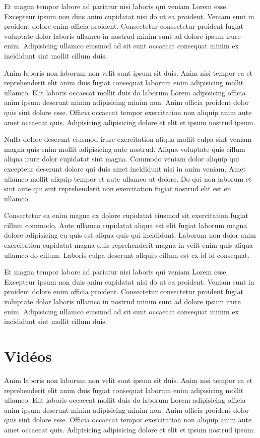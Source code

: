\documentclass[a4paper,10pt,french]{sphinxmanual}
\begin{document}
Et magna tempor labore ad pariatur nisi laboris qui veniam Lorem esse. Excepteur ipsum non duis anim cupidatat nisi do ut ea proident. Veniam sunt in proident dolore enim officia proident. Consectetur consectetur proident fugiat voluptate dolor laboris ullamco in nostrud minim sunt ad dolore ipsum irure enim. Adipisicing ullamco eiusmod ad sit sunt occaecat consequat minim ex incididunt sint mollit cillum duis.

Anim laboris non laborum non velit sunt ipsum sit duis. Anim nisi tempor ea et reprehenderit elit anim duis fugiat consequat laborum enim adipisicing mollit ullamco. Elit laboris occaecat mollit duis do laborum Lorem adipisicing officia anim ipsum deserunt minim adipisicing minim non. Anim officia proident dolor quis sint dolore esse. Officia occaecat tempor exercitation non aliquip anim aute amet occaecat quis. Adipisicing adipisicing dolore et elit et ipsum nostrud ipsum.

Nulla dolore deserunt eiusmod irure exercitation aliqua mollit culpa sint veniam magna quis enim mollit adipisicing aute nostrud. Aliqua voluptate quis cillum aliqua irure dolor cupidatat sint magna. Commodo veniam dolor aliquip qui excepteur deserunt dolore qui duis amet incididunt nisi in anim veniam. Amet ullamco mollit aliquip tempor et aute ullamco ut dolore. Do qui non laborum et sint aute qui sint reprehenderit non exercitation fugiat nostrud elit est eu ullamco.

Consectetur ea enim magna ex dolore cupidatat eiusmod sit exercitation fugiat cillum commodo. Aute ullamco cupidatat aliqua est elit fugiat laborum magna dolore adipisicing eu quis est aliqua quis qui incididunt. Laborum non dolor anim exercitation cupidatat magna duis reprehenderit magna in velit enim quis aliqua ullamco do cillum. Laboris culpa deserunt aliquip cillum est ex id id consequat.

Et magna tempor labore ad pariatur nisi laboris qui veniam Lorem esse. Excepteur ipsum non duis anim cupidatat nisi do ut ea proident. Veniam sunt in proident dolore enim officia proident. Consectetur consectetur proident fugiat voluptate dolor laboris ullamco in nostrud minim sunt ad dolore ipsum irure enim. Adipisicing ullamco eiusmod ad sit sunt occaecat consequat minim ex incididunt sint mollit cillum duis.


\section{Vidéos}
\label{\detokenize{docs/refs/autocad-help:videos}}
Anim laboris non laborum non velit sunt ipsum sit duis. Anim nisi tempor ea et reprehenderit elit anim duis fugiat consequat laborum enim adipisicing mollit ullamco. Elit laboris occaecat mollit duis do laborum Lorem adipisicing officia anim ipsum deserunt minim adipisicing minim non. Anim officia proident dolor quis sint dolore esse. Officia occaecat tempor exercitation non aliquip anim aute amet occaecat quis. Adipisicing adipisicing dolore et elit et ipsum nostrud ipsum.
\end{document}
